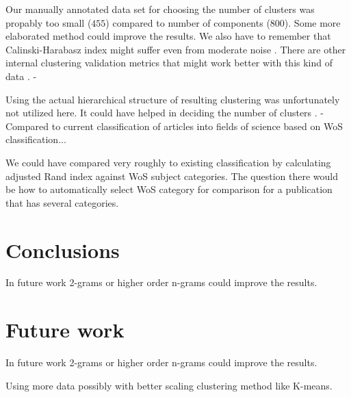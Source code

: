 Our manually annotated data set for choosing the number of clusters
was propably too small ($455$) compared to number of components 
($800$). Some more elaborated method could improve the results. 
We also have to remember that Calinski-Harabasz index might suffer
even from moderate noise \cite{liu_understanding_2010}.
There are other internal clustering validation metrics that might 
work better with this kind of data \cite{liu_understanding_2010}.
- 

Using the actual hierarchical structure of resulting clustering 
was unfortunately not utilized here. It could have helped in 
deciding the number of clusters \cite{kimes_statistical_2017}.
- Compared to current classification of articles into fields of 
science based on WoS classification...



We could have compared very roughly to existing classification by
calculating adjusted Rand index against WoS subject categories.
The question there would be how to automatically select WoS 
category for comparison for a publication that has several 
categories.

\section*{Conclusions}
\label{sec:conclusions}
In future work 2-grams or higher order n-grams could improve the 
results.


\section*{Future work}
\label{sec:future}
In future work 2-grams or higher order n-grams could improve the 
results.

Using more data possibly with better scaling clustering method like 
K-means.
